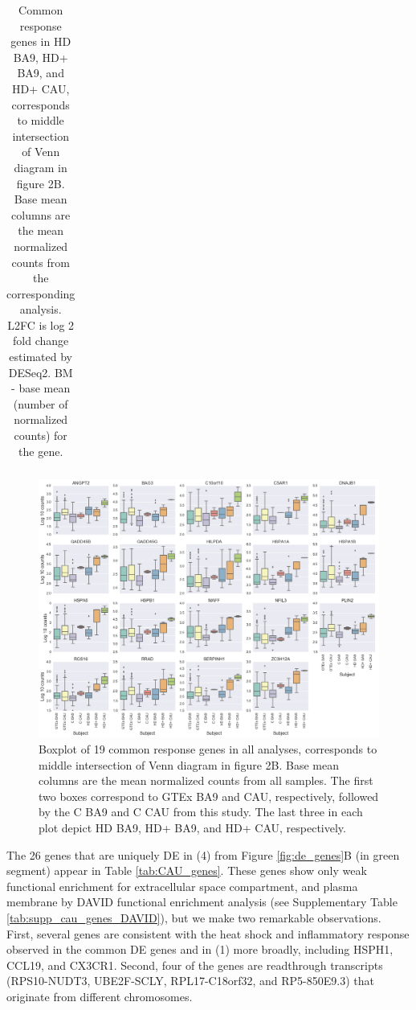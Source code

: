 \documentclass[fleqn,10pt,table]{wlscirep}
\begin{document}
\begin{table}[ht]
\begin{tabular}{|l|l|l|l|l|l|l|l|}
\end{tabular}
\caption{Common response genes in HD BA9, HD+ BA9, and HD+ CAU, corresponds to middle intersection of Venn diagram in figure 2B. Base mean columns are the mean normalized counts from the corresponding analysis. L2FC is log 2 fold change estimated by DESeq2. BM - base mean (number of normalized counts) for the gene. \label{tab:early_genes}}
\end{table}

\begin{figure}
\centering
\includegraphics[width=0.9\linewidth]{boxplots.png}
\caption{Boxplot of 19 common response genes in all analyses, corresponds to middle intersection of Venn diagram in figure 2B. Base mean columns are the mean normalized counts from all samples. The first two boxes correspond to GTEx BA9 and CAU, respectively, followed by the C BA9 and C CAU from this study. The last three in each plot depict HD BA9, HD+ BA9, and HD+ CAU, respectively.\label{fig:boxplot}}
\end{figure}


The 26 genes that are uniquely DE in (4) from Figure \ref{fig:de_genes}B (in green segment) appear in Table \ref{tab:CAU_genes}.
These genes show only weak functional enrichment for extracellular space compartment, and plasma membrane by DAVID functional enrichment analysis (see Supplementary Table \ref{tab:supp_cau_genes_DAVID}), but we make two remarkable observations.
First, several genes are consistent with the heat shock and inflammatory response observed in the common DE genes and in (1) more broadly, including HSPH1, CCL19, and CX3CR1.
Second, four of the genes are readthrough transcripts (RPS10-NUDT3, UBE2F-SCLY, RPL17-C18orf32, and RP5-850E9.3) that originate from different chromosomes.
\end{document}
